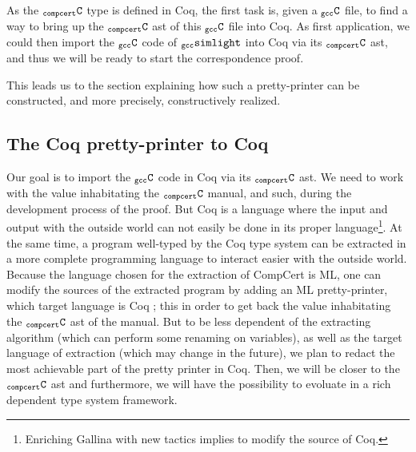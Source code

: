 \documentclass[a4paper, 11pt]{article}
\newcommand{\gccSL}{$_{\tt gcc}{\tt simlight}$\xspace}
\newcommand{\simgen}{{\tt simgen}\xspace}
\newcommand{\C}{$_{\tt compcert}{\tt C}$\xspace}
\newcommand{\gccC}{$_{\tt gcc}{\tt C}$\xspace}
\newcommand{\outworld}{the outside world\xspace}
\newcommand{\simsoc}{SimSoC\xspace}
\begin{document}
As the \C type is defined in Coq, the first task is, given a \gccC file, to find a way to bring up the \C ast of this \gccC file into Coq. As first application, we could then import the \gccC code of \gccSL into Coq via its \C ast, and thus we will be ready to start the correspondence proof.

\hspace{1ex}

This leads us to the section explaining how such a pretty-printer can be constructed, and more precisely, constructively realized.
\subsection{The Coq pretty-printer to Coq}
Our goal is to import the \gccC code in Coq via its \C ast. We need to work with the value inhabitating the \C manual, and such, during the development process of the proof. But Coq is a language where the input and output with \outworld can not easily be done in its proper language\footnote{Enriching Gallina with new tactics implies to modify the source of Coq.}. At the same time, a program well-typed by the Coq type system can be extracted in a more complete programming language to interact easier with \outworld. Because the language chosen for the extraction of CompCert is ML, one can modify the sources of the extracted program by adding an ML pretty-printer, which target language is Coq ; this in order to get back the value inhabitating the \C ast of the manual. But to be less dependent of the extracting algorithm (which can perform some renaming on variables), as well as the target language of extraction (which may change in the future), we plan to redact the most achievable part of the pretty printer in Coq. Then, we will be closer to the \C ast and furthermore, we will have the possibility to evoluate in a rich dependent type system framework. 
\end{document}
